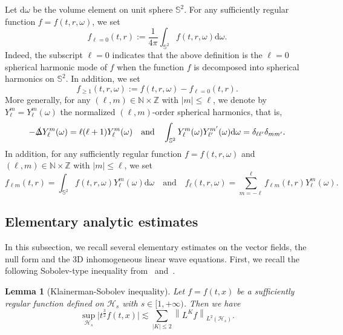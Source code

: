 \documentclass[a4paper,reqno]{amsart}
\newtheorem{lemma}[theorem]{Lemma}
\theoremstyle{definition}
\numberwithin{equation}{section}
\def\Deltas{\slashed{\Delta}}
\begin{document}
Let ${\mathrm{d}\omega}$ be the volume element on unit sphere $\mathbb{S}^{2}$. For any sufficiently regular function $f=f(t,r,\omega)$, we set 
\begin{equation*}
    f_{\ell=0}(t,r):=\frac{1}{4\pi}\int_{\mathbb{S}^{2}}f(t,r,\omega){ \mathrm{d}\omega}.
\end{equation*}
Indeed, the subscript $\ell=0$ indicates that the above definition is the $\ell=0$ spherical harmonic mode of $f$ when the function $f$ is decomposed into spherical harmonics on $\mathbb{S}^{2}$. 
In addition, we set 
\begin{equation*}
    f_{\ge 1}(t,r,\omega):=f(t,r,\omega)-f_{\ell=0}(t,r).
\end{equation*}
More generally, for any $(\ell,m)\in {\mathbb{N}\times\mathbb{Z}}$ with $|m|\le \ell$, we denote by $Y_{\ell }^{m}=Y_{\ell}^{m}(\omega)$ the normalized $(\ell,m)$-order spherical harmonics, that is, 
\begin{equation*}
    -\Deltas Y_{\ell}^{m}(\omega)=\ell(\ell+1)Y_{\ell}^{m}(\omega)\quad \mbox{and}\quad 
    \int_{\mathbb{S}^{2}}Y_{\ell}^{m}(\omega)Y_{\ell'}^{m'}(\omega){ \mathrm{d}\omega}=\delta_{\ell \ell'}\delta_{m m'}.
\end{equation*}
In addition, for any sufficiently regular function $f=f(t,r,\omega)$ and $(\ell,m)\in {\mathbb{N}\times\mathbb{Z}}$ with $|m|\le \ell$, we set 
\begin{equation*}
    {f_{\ell m}}(t,r)=\int_{\mathbb{S}^{2}}f(t,r,\omega)Y_{\ell}^{m}(\omega){ \mathrm{d}\omega}\quad \mbox{and}\quad 
    f_{\ell}(t,r,\omega)=\sum_{m=-\ell}^{\ell}f_{\ell m}(t,r)Y_{\ell}^{m}(\omega).
\end{equation*}


 \subsection{Elementary analytic estimates}
 In this subsection, we recall several elementary estimates on the vector fields, the null form and the 3D {inhomogeneous} linear wave equations. First, we recall the following Sobolev-type inequality from{~\cite[Proposition 1]{KlainWave} and~\cite[Lemma 7.6.1]{HomanderBook}}. 

 \begin{lemma}
     [Klainerman-Sobolev inequality]\label{le:Klain}
     Let $f=f(t,x)$ be a {sufficiently }regular function defined on $\mathcal{H}_{s}$ with $s\in  [1,+\infty)$. Then we have 
     \begin{equation*}
         \sup_{\mathcal{H}_{s}}\big|t^{\frac{3}{2}}f(t,x)\big|
         \lesssim \sum_{|K|\le 2}\left\|L^{K}f\right\|_{L^{2}(\mathcal{H}_{s})}.
     \end{equation*}
 \end{lemma}
\end{document}
